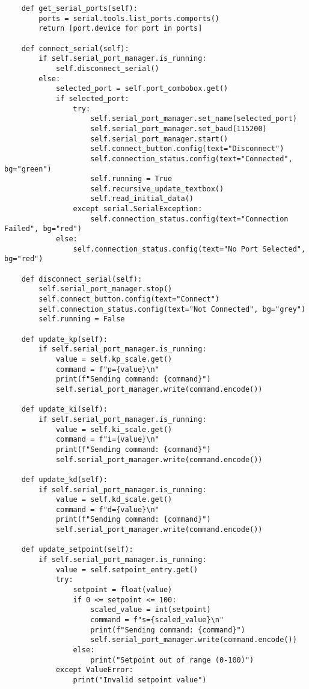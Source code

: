 \documentclass{article}
\begin{document}
\begin{verbatim}
    def get_serial_ports(self):
        ports = serial.tools.list_ports.comports()
        return [port.device for port in ports]

    def connect_serial(self):
        if self.serial_port_manager.is_running:
            self.disconnect_serial()
        else:
            selected_port = self.port_combobox.get()
            if selected_port:
                try:
                    self.serial_port_manager.set_name(selected_port)
                    self.serial_port_manager.set_baud(115200)
                    self.serial_port_manager.start()
                    self.connect_button.config(text="Disconnect")
                    self.connection_status.config(text="Connected", bg="green")
                    self.running = True
                    self.recursive_update_textbox()
                    self.read_initial_data()
                except serial.SerialException:
                    self.connection_status.config(text="Connection Failed", bg="red")
            else:
                self.connection_status.config(text="No Port Selected", bg="red")

    def disconnect_serial(self):
        self.serial_port_manager.stop()
        self.connect_button.config(text="Connect")
        self.connection_status.config(text="Not Connected", bg="grey")
        self.running = False

    def update_kp(self):
        if self.serial_port_manager.is_running:
            value = self.kp_scale.get()
            command = f"p={value}\n"
            print(f"Sending command: {command}")
            self.serial_port_manager.write(command.encode())

    def update_ki(self):
        if self.serial_port_manager.is_running:
            value = self.ki_scale.get()
            command = f"i={value}\n"
            print(f"Sending command: {command}")
            self.serial_port_manager.write(command.encode())

    def update_kd(self):
        if self.serial_port_manager.is_running:
            value = self.kd_scale.get()
            command = f"d={value}\n"
            print(f"Sending command: {command}")
            self.serial_port_manager.write(command.encode())

    def update_setpoint(self):
        if self.serial_port_manager.is_running:
            value = self.setpoint_entry.get()
            try:
                setpoint = float(value)
                if 0 <= setpoint <= 100:
                    scaled_value = int(setpoint)
                    command = f"s={scaled_value}\n"
                    print(f"Sending command: {command}")
                    self.serial_port_manager.write(command.encode())
                else:
                    print("Setpoint out of range (0-100)")
            except ValueError:
                print("Invalid setpoint value")


\end{verbatim}
\end{document}
